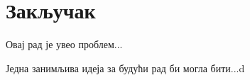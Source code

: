 \documentclass[a4paper, 12pt, master, utf8]{etf}
\begin{document}
\chapter{Закључак }
\label{sec:6}

Овај рад је увео проблем...

Једна занимљива идеја за будући рад би могла бити...d





\end{document}
